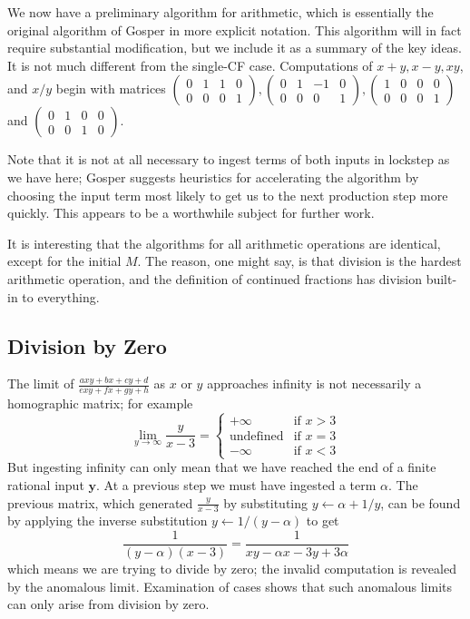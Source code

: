 \documentclass[11pt, oneside]{amsart}   	%
\newcommand{\bihomographic}[8]{\left(\begin{smallmatrix}#1&#2&#3&#4\\#5&#6&#7&#8\end{smallmatrix}\right)}
\begin{document}
We now have a preliminary algorithm for arithmetic, which is essentially the original algorithm of Gosper in more explicit notation. 
This algorithm will in fact require substantial modification, but we include it as a summary
of the key ideas. It is not much different from the single-CF case. Computations of $x+y, x-y,xy$, and $x/y$ begin with matrices
$\bihomographic{0}{1}{1}{0}{0}{0}{0}{1}, \bihomographic{0}{1}{-1}{0}{0}{0}{0}{1},
\bihomographic{1}{0}{0}{0}{0}{0}{0}{1}$ and $\bihomographic{0}{1}{0}{0}{0}{0}{1}{0}$.

Note that it is not at all necessary to ingest terms of both inputs in lockstep as we have here;
Gosper suggests heuristics for accelerating the algorithm by choosing the input term most likely to get us to the next production step
more quickly. This appears to be a worthwhile subject for further work.

It is interesting that the algorithms for all arithmetic operations are identical, except for the initial $M$. The reason, one might say, is
that division is the hardest arithmetic operation, and the definition of continued fractions has division built-in to everything.


\subsection{Division by Zero}\label{sec:anomalous}
The limit of $\frac{axy + bx + cy + d}{exy + fx + gy + h}$ as $x$ or $y$ approaches infinity is not necessarily a homographic matrix; for example
\[
\lim_{y \to \infty} \frac{y}{x-3} = \begin{cases}
                                                          +\infty & \mbox{if } x > 3 \\
                                                          \mbox{undefined} & \mbox{if } x=3 \\
                                                          -\infty & \mbox{if } x < 3
                                                         \end{cases}
\]
But ingesting infinity can only mean that we have reached the end of a finite rational input $\mathbf{y}$. At a previous step we
must have ingested a term $\alpha$. The previous matrix, which generated $\frac{y}{x-3}$ by substituting $y \leftarrow \alpha + 1/y$, can be found by applying the inverse substitution $y \leftarrow 1/(y-\alpha)$ to get
\[
\frac{1}{(y-\alpha)(x-3)} = \frac{1}{xy - \alpha x -3y +3\alpha}
\]
which means we are trying to divide by zero; the invalid computation is revealed by the anomalous limit.
Examination of cases shows that such anomalous limits can only arise from division by zero.
\end{document}
